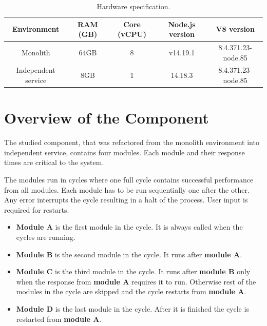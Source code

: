 \begin{table}[h!]
    \begin{tabular}{|c|c|c|c|c|} 
        \hline
        Environment
        & RAM (GB)
        & Core (vCPU)
        & Node.js version
        & V8 version
        \\ 
        \hline
        Monolith
        & 64GB
        & 8
        & v14.19.1
        & 8.4.371.23-node.85
        \\
        \hline
        Independent service
        & 8GB
        & 1
        & 14.18.3
        & 8.4.371.23-node.85
        \\
        \hline
    \end{tabular}    
    \caption{Hardware specification.}
    \label{table:harware:specs}
\end{table}

\section{Overview of the Component}
The studied component, that was refactored from the monolith environment into independent service, contains four modules.
Each module and their response times are critical to the system.

The modules run in cycles where one full cycle contains successful performance from all modules.
Each module has to be run sequentially one after the other.
Any error interrupts the cycle resulting in a halt of the process.
User input is required for restarts.
\begin{itemize}
    \item
    \textbf{Module A} is the first module in the cycle.
    It is always called when the cycles are running.
    
    \item
    \textbf{Module B} is the second module in the cycle.
    It runs after \textbf{module A}.
    
    \item
    \textbf{Module C} is the third module in the cycle.
    It runs after \textbf{module B} only when the response from \textbf{module A} requires it to run.
    Otherwise rest of the modules in the cycle are skipped and the cycle restarts from \textbf{module A}.

    \item
    \textbf{Module D} is the last module in the cycle.
    After it is finished the cycle is restarted from \textbf{module A}.
\end{itemize}

